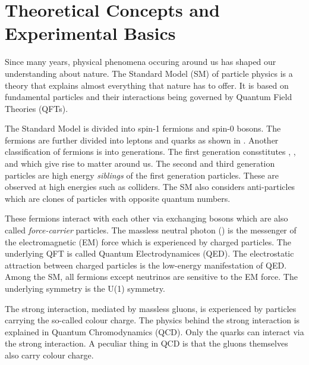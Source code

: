 
\chapter{Theoretical Concepts and Experimental Basics}
\label{sec:SM}

Since many years, physical phenomena occuring around us has shaped our understanding about nature.
The Standard Model (SM) of particle physics is a theory that explains almost everything
that nature has to offer. It is based on fundamental particles and their interactions
being governed by Quantum Field Theories (QFTs). 

The Standard Model is divided into spin-1 fermions and spin-0 bosons. The fermions are
further divided into leptons and quarks as shown in . Another
classification of fermions is into generations. The first generation consstitutes
\Pup, \Pdown, \Pelectron and \Pnue which give rise to matter around us. The second
and third generation particles are high energy \textit{siblings} of the first generation
particles. These are observed at high energies such as colliders. The SM also considers
anti-particles which are clones of particles with opposite quantum numbers.

These fermions interact with each other via exchanging bosons which are also called 
\textit{force-carrier} particles. The massless neutral photon (\Pphoton) is the 
messenger of the electromagnetic (EM) force which is experienced by charged particles.
The underlying QFT is called Quantum Electrodynamices (QED). The electrostatic 
attraction between charged particles is the low-energy manifestation of QED. Among 
the SM, all fermions except neutrinos are sensitive to the EM force. The underlying symmetry
is the U(1) symmetry. 

The strong interaction, mediated by massless gluons, is experienced by particles 
carrying the so-called colour charge. The physics behind the strong interaction is 
explained in Quantum Chromodynamics (QCD). Only the quarks can interact via the 
strong interaction. A peculiar thing in QCD is that the gluons themselves also carry 
colour charge. 

